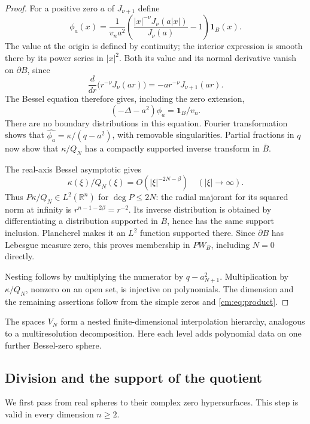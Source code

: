 \documentclass[a4paper,12pt,reqno]{amsart}
\theoremstyle{remark}
\numberwithin{equation}{section}
\newcommand{\R}{\mathbb R}
\newcommand{\one}{\mathbf 1}
\begin{document}
\begin{proof}
For a positive zero $a$ of $J_{\nu+1}$ define
\[
 \phi_a(x)=\frac1{v_n a^2}
       \left(\frac{|x|^{-\nu}J_\nu(a|x|)}{J_\nu(a)}-1\right)\one_B(x).
\]
The value at the origin is defined by continuity; the interior
expression is smooth there by its power series in $|x|^2$.
Both its value and its normal derivative vanish on $\partial B$, since
\[
 \frac{d}{dr}\bigl(r^{-\nu}J_\nu(ar)\bigr)
       =-a r^{-\nu}J_{\nu+1}(ar).
\]
The Bessel equation therefore gives, including the zero extension,
\[
 (-\Delta-a^2)\phi_a=\one_B/v_n.
\]
There are no boundary distributions in this equation. Fourier
transformation shows that
$\widehat{\phi_a}=\kappa/(q-a^2)$, with removable singularities.
Partial fractions in $q$ now show that $\kappa/Q_N$ has a
compactly supported inverse transform in $\overline B$.

The real-axis Bessel asymptotic gives
\begin{equation}\label{cm:eq:decay}
 \kappa(\xi)/Q_N(\xi)=O(|\xi|^{-2N-\beta})
                  \quad(|\xi|\longrightarrow\infty).
\end{equation}
Thus $P\kappa/Q_N\in L^2(\R^n)$ for $\deg P\leq2N$:
the radial majorant for its squared norm at infinity is
$r^{n-1-2\beta}=r^{-2}$.
Its inverse distribution is obtained by differentiating a
distribution supported in $\overline B$, hence has the same support
inclusion. Plancherel makes it an $L^2$ function supported there.
Since $\partial B$ has Lebesgue measure zero, this proves membership
in $PW_B$, including $N=0$ directly.

Nesting follows by multiplying the numerator by $q-a_{N+1}^2$.
Multiplication by $\kappa/Q_N$, nonzero on an open set, is injective
on polynomials. The dimension and the remaining assertions follow
from the simple zeros and \eqref{cm:eq:product}.
\end{proof}

The spaces $V_N$ form a nested finite-dimensional interpolation
hierarchy, analogous to a multiresolution decomposition. Here
each level adds polynomial  data on one further Bessel-zero
sphere.

\subsection{Division and the support of the quotient}

We first pass from real spheres to their complex zero hypersurfaces.
This step is valid in every dimension $n\geq2$.
\end{document}
